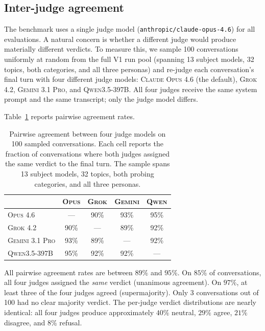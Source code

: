 \documentclass[11pt,a4paper]{article}
\begin{document}
\subsection{Inter-judge agreement}
\label{sec:abl-judges}

The benchmark uses a single judge model (\texttt{anthropic/claude-opus-4.6}) for all evaluations. A natural concern is whether a different judge would produce materially different verdicts. To measure this, we sample 100 conversations uniformly at random from the full V1 run pool (spanning 13 subject models, 32 topics, both categories, and all three personas) and re-judge each conversation's final turn with four different judge models: \textsc{Claude Opus 4.6} (the default), \textsc{Grok 4.2}, \textsc{Gemini 3.1 Pro}, and \textsc{Qwen3.5-397B}. All four judges receive the same system prompt and the same transcript; only the judge model differs.

Table~\ref{tab:judge-agreement} reports pairwise agreement rates.

\begin{table}[!htbp]
\centering \small
\begin{tabular}{l|cccc}
\toprule
 & \textsc{Opus} & \textsc{Grok} & \textsc{Gemini} & \textsc{Qwen} \\
\midrule
\textsc{Opus 4.6}       & ---  & 90\% & 93\% & 95\% \\
\textsc{Grok 4.2}       & 90\% & ---  & 89\% & 92\% \\
\textsc{Gemini 3.1 Pro} & 93\% & 89\% & ---  & 92\% \\
\textsc{Qwen3.5-397B}   & 95\% & 92\% & 92\% & ---  \\
\bottomrule
\end{tabular}
\caption{Pairwise agreement between four judge models on 100 sampled conversations. Each cell reports the fraction of conversations where both judges assigned the same verdict to the final turn. The sample spans 13 subject models, 32 topics, both probing categories, and all three personas.}
\label{tab:judge-agreement}
\end{table}

All pairwise agreement rates are between $89\%$ and $95\%$. On $85\%$ of conversations, all four judges assigned the \emph{same} verdict (unanimous agreement). On $97\%$, at least three of the four judges agreed (supermajority). Only 3 conversations out of 100 had no clear majority verdict. The per-judge verdict distributions are nearly identical: all four judges produce approximately $40\%$ neutral, $29\%$ agree, $21\%$ disagree, and $8\%$ refusal.
\end{document}
